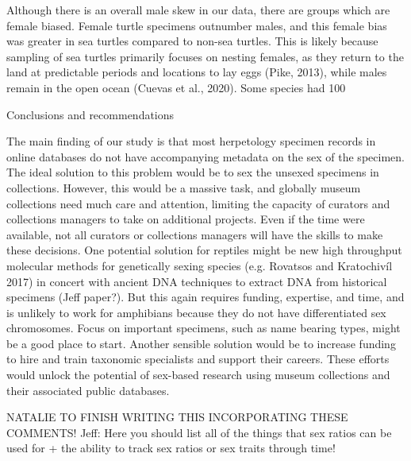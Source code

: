 \documentclass[a4paper, 12pt]{article}
\begin{document}
Although there is an overall male skew in our data, there are groups which are female biased. Female turtle specimens outnumber males, and this female bias was greater in sea turtles compared to non-sea turtles. This is likely because sampling of sea turtles primarily focuses on nesting females, as they return to the land at predictable periods and locations to lay eggs (Pike, 2013), while males remain in the open ocean (Cuevas et al., 2020). Some species had 100%

Conclusions and recommendations

The main finding of our study is that most herpetology specimen records in online databases do not have accompanying metadata on the sex of the specimen. The ideal solution to this problem would be to sex the unsexed specimens in collections. However, this would be a massive task, and globally museum collections need much care and attention, limiting the capacity of curators and collections managers to take on additional projects. Even if the time were available, not all curators or collections managers will have the skills to make these decisions. One potential solution for reptiles might be new high throughput molecular methods for genetically sexing species (e.g. Rovatsos and Kratochivíl 2017) in concert with ancient DNA techniques to extract DNA from historical specimens (Jeff paper?). But this again requires funding, expertise, and time, and is unlikely to work for amphibians because they do not have differentiated sex chromosomes. Focus on important specimens, such as name bearing types, might be a good place to start. Another sensible solution would be to increase funding to hire and train taxonomic specialists and support their careers. These efforts would unlock the potential of sex-based research using museum collections and their associated public databases.

NATALIE TO FINISH WRITING THIS INCORPORATING THESE COMMENTS!
Jeff: Here you should list all of the things that sex ratios can be used for + the ability to track sex ratios or sex traits through time!
\end{document}
